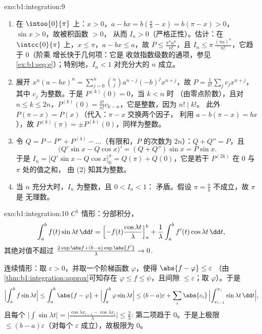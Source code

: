 \begin{solution}{exo:b1:integration:9}
\begin{enumerate}
  \item 在 $\intoo{0}{\pi}$ 上：$x > 0$，$a - bx = b(\frac ab - x) =
        b(\pi - x) > 0$，$\sin x > 0$，故被积函数 $> 0$，
        从而 $I_n > 0$（严格正性）。估计：在
        $\intcc{0}{\pi}$ 上，$x \leq \pi$，$a - bx \leq a$，故 $P
        \leq \frac{\pi^n a^n}{n!}$，且 $I_n \leq
        \pi\,\frac{(\pi a)^n}{n!}$，它趋于 $0$（阶乘
        增长快于几何项：它是
        收敛指数级数的通项，参见
        \cref{ex:b1:seq:e}）；特别地，$I_n < 1$ 对充分大的 $n$ 成立。
  \item 展开 $x^n(a - bx)^n = \sum_{j=0}^{n} \binom nj a^{n-j}
        (-b)^j x^{n+j}$，故 $P = \frac{1}{n!}\sum_j c_j x^{n+j}$，
        其中 $c_j$ 为整数。于是 $P^{(k)}(0) = 0$，当 $k < n$ 时
        （由零点阶数），且对 $n \leq k \leq 2n$，$P^{(k)}(0) =
        \frac{k!}{n!} c_{k-n}$，它是整数，因为 $n! \mid k!$。
        此外 $P(\pi - x) = P(x)$（代入：$\pi - x$ 交换两个因子，
        利用 $a - b(\pi - x) = bx$），故 $P^{(k)}(\pi)
        = \pm P^{(k)}(0)$，同样为整数。
  \item 令 $Q = P - P'' + P^{(4)} - \dots$（有限和，$P$ 的次数为
        $2n$）：$Q + Q'' = P$，且
        \[
        \bigl(Q'\sin x - Q\cos x\bigr)' = (Q + Q'')\sin x = P\sin x .
        \]
        于是 $I_n = \bigl[Q'\sin x - Q\cos x\bigr]_0^{\pi} = Q(\pi)
        + Q(0)$，它是若干 $P^{(2k)}$ 在 $0$ 与 $\pi$ 处的值之和，
        由 (2) 知其为整数。
  \item 当 $n$ 充分大时，$I_n$ 为整数，且 $0 < I_n < 1$：
        矛盾。假设 $\pi = \frac ab$ 不成立，故 $\pi$ 是
        无理数。
\end{enumerate}
\end{solution}

\begin{solution}{exo:b1:integration:10}
$C^1$ 情形：分部积分，
\[
\int_a^b f(t)\sin\lambda t\,\dd t
= \Bigl[-f(t)\frac{\cos\lambda t}{\lambda}\Bigr]_a^b
+ \frac{1}{\lambda}\int_a^b f'(t)\cos\lambda t\,\dd t,
\]
其绝对值不超过 $\frac{2\sup\abs f + (b - a)\sup\abs{f'}}
{\lambda} \to 0$.

连续情形：取 $\varepsilon > 0$，并取一个阶梯函数
$\varphi$，使得 $\abs{f - \varphi} \leq \varepsilon$
（由\cref{thm:b1:integration:approx}可知存在 $\varphi \leq f \leq
\psi$，且间隙 $\leq\varepsilon$；取 $\varphi$）。于是
\[
\Bigl|\int_a^b f\sin\lambda t\Bigr|
\leq \int_a^b \abs{f - \varphi}
+ \Bigl|\int_a^b \varphi \sin\lambda t\Bigr|
\leq (b-a)\varepsilon
+ \sum_i \abs{c_i}\,\Bigl|\int_{x_{i-1}}^{x_i} \sin\lambda t\,\dd
t\Bigr| ,
\]
且每个 $\bigl|\int \sin \lambda t\bigr| = \bigl|\frac{\cos\lambda
x_{i-1} - \cos\lambda x_i}{\lambda}\bigr| \leq \frac{2}{\lambda}$:
第二项趋于 $0$。于是上极限 $\leq
(b-a)\varepsilon$（对每个 $\varepsilon$ 成立），故极限为 $0$。
\end{solution}

